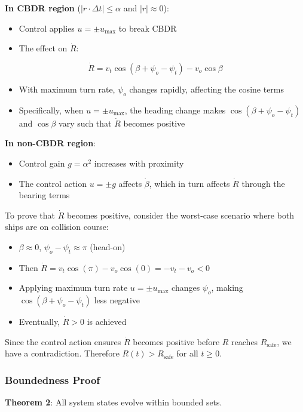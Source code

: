 \documentclass[11pt,a4paper]{article}
\numberwithin{equation}{section}
\begin{document}
\textbf{In CBDR region} ($|r \cdot \Delta t| \leq \alpha$ and $|r| \approx 0$):
\begin{itemize}
\item Control applies $u = \pm u_{\max}$ to break CBDR
\item The effect on $\dot{R}$:
\end{itemize}

\[
\dot{R} = v_t\cos(\beta + \psi_o - \psi_t) - v_o\cos\beta
\]

\begin{itemize}
\item With maximum turn rate, $\psi_o$ changes rapidly, affecting the cosine terms
\item Specifically, when $u = \pm u_{\max}$, the heading change makes $\cos(\beta + \psi_o - \psi_t)$ and $\cos\beta$ vary such that $\dot{R}$ becomes positive
\end{itemize}

\textbf{In non-CBDR region}:
\begin{itemize}
\item Control gain $g = \alpha^2$ increases with proximity
\item The control action $u = \pm g$ affects $\dot{\beta}$, which in turn affects $\dot{R}$ through the bearing terms
\end{itemize}

To prove that $\dot{R}$ becomes positive, consider the worst-case scenario where both ships are on collision course:
\begin{itemize}
\item $\beta \approx 0$, $\psi_o - \psi_t \approx \pi$ (head-on)
\item Then $\dot{R} = v_t\cos(\pi) - v_o\cos(0) = -v_t - v_o < 0$
\item Applying maximum turn rate $u = \pm u_{\max}$ changes $\psi_o$, making $\cos(\beta + \psi_o - \psi_t)$ less negative
\item Eventually, $\dot{R} > 0$ is achieved
\end{itemize}

Since the control action ensures $\dot{R}$ becomes positive before $R$ reaches $R_{\text{safe}}$, we have a contradiction. Therefore $R(t) > R_{\text{safe}}$ for all $t \geq 0$.

\subsubsection{Boundedness Proof}

\textbf{Theorem 2}: All system states evolve within bounded sets.
\end{document}
